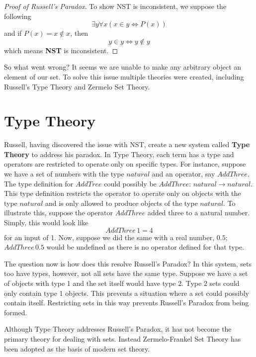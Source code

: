 \begin{proof}[Proof of Russell's Paradox]
  To show NST is inconsistent, we suppose the following
  $$
    \exists y \forall x (x \in y \iff P(x))
  $$
  and if $P(x) = x \notin x$, then
  $$
    y \in y \iff y \notin y
  $$
which means \textbf{NST} is inconsistent.
\end{proof}

So what went wrong?
It seems we are unable to make any arbitrary object an element of our set.
To solve this issue multiple theories were created, including Russell's Type Theory and Zermelo Set Theory.

\section{Type Theory}
\label{set:russelltype}

Russell, having discovered the issue with NST, create a new system called \textbf{Type Theory} to address his paradox.
In Type Theory, each term has a type and operators are restricted to operate only on specific types.
For instance, suppose we have a set of numbers with the type $natural$ and an operator, say $AddThree$.
The type definition for $AddTree$ could possibly be $ AddThree: \, natural \rightarrow  natural $.
This type definition restricts the operator to operate only on objects with the type $natural$ and is only allowed to produce objects of the type $natural$.
To illustrate this, suppose the operator $AddThree$ added three to a natural number.
Simply, this would look like
$$
AddThree\, 1 = 4
$$
for an input of 1.
Now, suppose we did the same with a real number, $0.5$; $AddThree\, 0.5 $ would be undefined as there is no operator defined for that type.

The question now is how does this resolve Russell's Paradox?
In this system, sets too have types, however, not all sets have the same type.
Suppose we have a set of objects with type 1 and the set itself would have type 2.
Type 2 sets could only contain type 1 objects.
This prevents a situation where a set could possibly contain itself.
Restricting sets in this way prevents Russell's Paradox from being formed.

Although Type Theory addresses Russell's Paradox, it has not become the primary theory for dealing with sets.
Instead Zermelo-Frankel Set Theory has been adopted as the basis of modern set theory.


